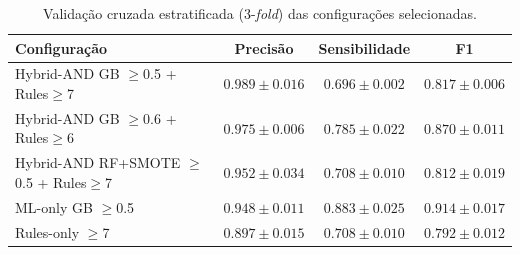\begin{table}[htbp]
\centering
\caption{Validação cruzada estratificada (3-\textit{fold}) das configurações selecionadas.}
\label{tab:cv-results}
\small
\begin{tabular}{lccc}
\toprule
Configuração & Precisão & Sensibilidade & F1 \\
\midrule
Hybrid-AND GB $\geq$0.5 + Rules$\geq$7 & $0.989 \pm 0.016$ & $0.696 \pm 0.002$ & $0.817 \pm 0.006$ \\
Hybrid-AND GB $\geq$0.6 + Rules$\geq$6 & $0.975 \pm 0.006$ & $0.785 \pm 0.022$ & $0.870 \pm 0.011$ \\
Hybrid-AND RF+SMOTE $\geq$0.5 + Rules$\geq$7 & $0.952 \pm 0.034$ & $0.708 \pm 0.010$ & $0.812 \pm 0.019$ \\
ML-only GB $\geq$0.5 & $0.948 \pm 0.011$ & $0.883 \pm 0.025$ & $0.914 \pm 0.017$ \\
Rules-only $\geq$7 & $0.897 \pm 0.015$ & $0.708 \pm 0.010$ & $0.792 \pm 0.012$ \\
\bottomrule
\end{tabular}
\end{table}